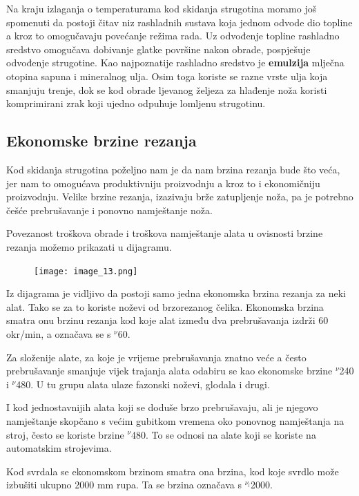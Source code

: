 \documentclass[a4paper,12pt]{article}
\numberwithin{figure}{section}
\begin{document}
\begin{enumerate}
Na kraju izlaganja o temperaturama kod skidanja strugotina moramo još spomenuti da postoji čitav niz rashladnih sustava koja jednom odvode dio topline a kroz to omogučavaju povećanje režima rada. Uz odvođenje topline rashladno sredstvo omogučava dobivanje glatke površine nakon obrade, pospješuje odvođenje strugotine. Kao najpoznatije rashladno sredstvo je \textbf{emulzija} mlječna otopina sapuna i mineralnog ulja. Osim toga koriste se razne vrste ulja koja smanjuju trenje, dok se kod obrade ljevanog željeza za hlađenje noža koristi komprimirani zrak koji ujedno odpuhuje lomljenu strugotinu.
\end{enumerate}
\subsection{Ekonomske brzine rezanja}
Kod skidanja strugotina poželjno nam je da nam brzina rezanja bude što veća, jer nam to omogućava produktivniju proizvodnju a kroz to i ekonomičniju proizvodnju. Velike brzine rezanja, izazivaju brže zatupljenje noža, pa je potrebno češće prebrušavanje i ponovno namještanje noža. \par
Povezanost troškova obrade i troškova namještanje alata u ovisnosti brzine rezanja možemo prikazati u dijagramu.
\begin{figure}[!h]
\centering
\texttt{[image: image\_13.png]}
\end{figure}
\FloatBarrier
Iz dijagrama je vidljivo da postoji samo jedna ekonomska brzina rezanja za neki alat. Tako se za to koriste noževi od brzorezanog čelika. Ekonomska brzina smatra onu brzinu rezanja kod koje alat između dva prebrušavanja izdrži 60 okr/min, a označava se s $^{\nu}$60.\par 
Za složenije alate, za koje je vrijeme prebrušavanja znatno veće a često prebrušavanje smanjuje vijek trajanja alata odabiru se kao ekonomske brzine $^{\nu}$240 i $^{\nu}$480. U tu grupu alata ulaze fazonski noževi, glodala i drugi. \par
I kod jednostavnijih alata koji se doduše brzo prebrušavaju, ali je njegovo namještanje skopčano s većim gubitkom vremena oko ponovnog namještanja na stroj, često se koriste brzine $^{\nu}$480. To se odnosi na alate koji se koriste na automatskim strojevima. \par
Kod svrdala se ekonomskom brzinom smatra ona brzina, kod koje svrdlo može izbušiti ukupno 2000 mm rupa. Ta se brzina označava s $^{\nu_{l}}$2000.
\end{document}
